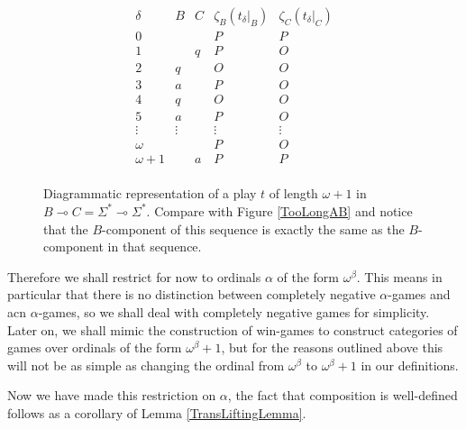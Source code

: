\documentclass[11pt]{article} %
\theoremstyle{plain} %
\theoremstyle{definition} %
\theoremstyle{note}
\theoremstyle{exercisestyle}
\renewcommand{\implies}{\multimap}
\newcommand{\st}{{\Sigma^*}}
\begin{document}
\begin{figure}[!ht]
  \[
    \begin{array}{ccccc}
      \delta & B & C & \zeta_B(t_\delta\vert_B) & \zeta_C(t_\delta\vert_C) \\
      \hline
      0 & & & P & P \\
      \hline
      1 & & q & P & O \\
      2 & q & & O & O \\
      3 & a & & P & O \\
      4 & q & & O & O \\
      5 & a & & P & O \\
      \vdots & \vdots & & \vdots & \vdots \\
      \hline
      \omega & & & P & O \\
      \hline
      \omega+1 & & a & P & P \\
    \end{array}
    \]
  \caption{Diagrammatic representation of a play $t$ of length $\omega+1$ in $B\implies C=\st\implies \st$.  Compare with Figure \ref{TooLongAB} and notice that the $B$-component of this sequence is exactly the same as the $B$-component in that sequence.}
  \label{TooLongBC}
\end{figure}

Therefore we shall restrict for now to ordinals $\alpha$ of the form $\omega^\beta$.  This means in particular that there is no distinction between completely negative $\alpha$-games and acn $\alpha$-games, so we shall deal with completely negative games for simplicity.  Later on, we shall mimic the construction of win-games to construct categories of games over ordinals of the form $\omega^\beta+1$, but for the reasons outlined above this will not be as simple as changing the ordinal from $\omega^\beta$ to $\omega^\beta+1$ in our definitions.

Now we have made this restriction on $\alpha$, the fact that composition is well-defined follows as a corollary of Lemma \ref{TransLiftingLemma}.  
\end{document}
